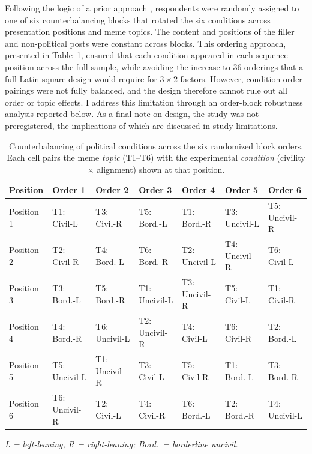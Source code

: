 \documentclass[12pt]{article}
\begin{document}
Following the logic of a prior approach \parencite{mutzEffectsInYourFaceTelevision2007}, respondents were randomly assigned to one of six counterbalancing blocks that rotated the six conditions across presentation positions and meme topics. The content and positions of the filler and non-political posts were constant across blocks. This ordering approach, presented in Table~\ref{tab:counterbalance}, ensured that each condition appeared in each sequence position across the full sample, while avoiding the increase to 36 orderings that a full Latin-square design would require for $3\times2$ factors. However, condition-order pairings were not fully balanced, and the design therefore cannot rule out all order or topic effects. I address this limitation through an order-block robustness analysis reported below. As a final note on design, the study was not preregistered, the implications of which are discussed in study limitations.

\vspace{0.75em}


\begin{table}[H]
    \centering
    \caption{Counterbalancing of political conditions across the six randomized block orders. Each cell pairs the meme \emph{topic} (T1--T6) with the experimental \emph{condition} (civility $\times$ alignment) shown at that position.}
    \label{tab:counterbalance}
    \footnotesize
    \setlength{\tabcolsep}{4pt}
    \renewcommand{\arraystretch}{1.2}
    \begin{tabular}{@{}l l l l l l l@{}}
        \toprule
        \textbf{Position} & \textbf{Order 1} & \textbf{Order 2} & \textbf{Order 3} & \textbf{Order 4} & \textbf{Order 5} & \textbf{Order 6} \\
        \midrule
        Position 1 & T1: Civil-L     & T3: Civil-R      & T5: Bord.-L      & T1: Bord.-R      & T3: Uncivil-L    & T5: Uncivil-R \\
        Position 2 & T2: Civil-R     & T4: Bord.-L      & T6: Bord.-R      & T2: Uncivil-L    & T4: Uncivil-R    & T6: Civil-L \\
        Position 3 & T3: Bord.-L     & T5: Bord.-R      & T1: Uncivil-L    & T3: Uncivil-R    & T5: Civil-L      & T1: Civil-R \\
        Position 4 & T4: Bord.-R     & T6: Uncivil-L    & T2: Uncivil-R    & T4: Civil-L      & T6: Civil-R      & T2: Bord.-L \\
        Position 5 & T5: Uncivil-L   & T1: Uncivil-R    & T3: Civil-L      & T5: Civil-R      & T1: Bord.-L      & T3: Bord.-R \\
        Position 6 & T6: Uncivil-R   & T2: Civil-L      & T4: Civil-R      & T6: Bord.-L      & T2: Bord.-R      & T4: Uncivil-L \\
        \bottomrule
    \end{tabular}

    \vspace{2pt}
    {\footnotesize\itshape L = left-leaning, R = right-leaning; Bord.\ = borderline uncivil.}
\end{table}
\end{document}
